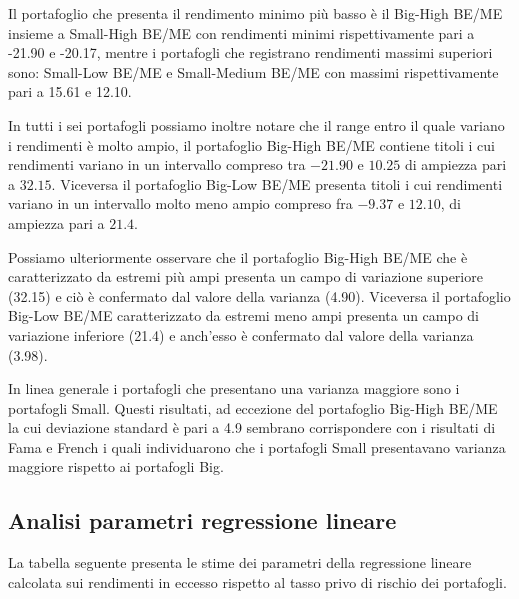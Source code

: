 Il portafoglio che presenta il rendimento minimo più basso è il Big-High BE/ME insieme a Small-High BE/ME con rendimenti minimi rispettivamente pari a -21.90 e -20.17, mentre i portafogli che registrano rendimenti massimi superiori sono: Small-Low BE/ME e Small-Medium BE/ME con massimi rispettivamente pari a 15.61 e 12.10. 


In tutti i sei portafogli possiamo inoltre notare che il range entro il quale variano i rendimenti è molto ampio, il portafoglio Big-High BE/ME contiene titoli i cui rendimenti variano in un intervallo compreso tra $-21.90$ e $10.25$ di ampiezza pari a $32.15$. Viceversa il portafoglio Big-Low BE/ME presenta titoli i cui rendimenti variano in un intervallo molto meno ampio compreso fra $-9.37$ e $12.10$, di ampiezza pari a $21.4$. 

Possiamo ulteriormente osservare che il portafoglio Big-High BE/ME che è caratterizzato da estremi più ampi presenta un campo di variazione superiore (32.15) e ciò è confermato dal valore della varianza (4.90). Viceversa il portafoglio Big-Low BE/ME caratterizzato da estremi meno ampi presenta un campo di variazione inferiore (21.4) e anch'esso è confermato dal valore della varianza (3.98). 

In linea generale i portafogli che presentano una varianza maggiore sono i portafogli Small. Questi risultati, ad eccezione del portafoglio Big-High BE/ME la cui deviazione standard è pari a 4.9 sembrano corrispondere con i risultati di Fama e French i quali individuarono che i portafogli Small presentavano varianza maggiore rispetto ai portafogli Big. 

\subsection{Analisi parametri regressione lineare}
La tabella seguente presenta le stime dei parametri della regressione lineare calcolata sui rendimenti in eccesso rispetto al tasso privo di rischio dei portafogli.

